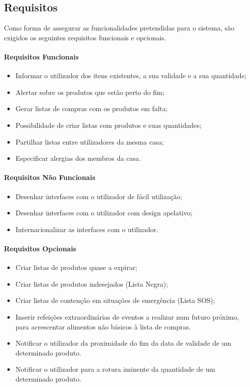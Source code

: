 %
%
\subsection{Requisitos} \label{subsec221}
Como forma de assegurar as funcionalidades pretendidas para o sistema, são exigidos os seguintes requisitos funcionais e opcionais.

\paragraph{Requisitos Funcionais}
\begin{itemize}
	\item Informar o utilizador dos itens existentes, a sua validade e a sua quantidade;
	\item Alertar sobre os produtos que estão perto do fim;
	\item Gerar listas de compras com os produtos em falta;
	\item Possibilidade de criar listas com produtos e suas quantidades;
	\item Partilhar listas entre utilizadores da mesma casa;
	\item Especificar alergias dos membros da casa.
\end{itemize}

\paragraph{Requisitos Não Funcionais}
\begin{itemize}
	\item Desenhar interfaces com o utilizador de fácil utilização;
	\item Desenhar interfaces com o utilizador com design apelativo;
	\item Internacionalizar as interfaces com o utilizador.
\end{itemize}

\paragraph{Requisitos Opcionais}
\begin{itemize}
	\item Criar listas de produtos quase a expirar;
	\item Criar listas de produtos indesejados (Lista Negra);
	\item Criar listas de contenção em situações de emergência (Lista SOS);
	\item Inserir refeições extraordinárias de eventos a realizar num futuro próximo, para acrescentar alimentos não básicos à lista de compras.
	\item Notificar o utilizador da proximidade do fim da data de validade de um determinado produto.
	\item Notificar o utilizador para a rotura iminente da quantidade de um determinado produto.
\end{itemize}


